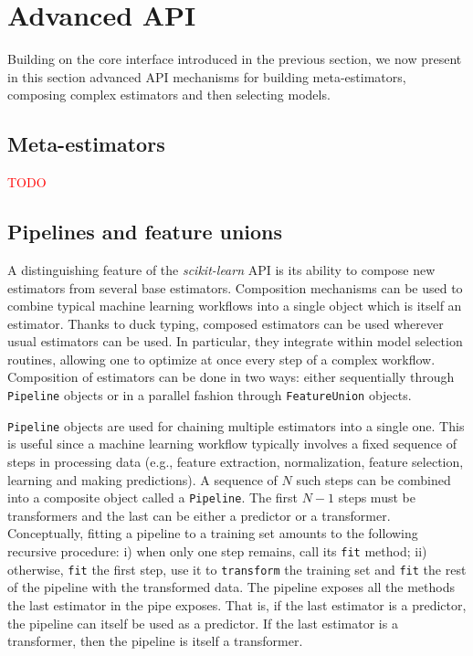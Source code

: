 \documentclass{llncs}
\newcommand{\sklearn}{\textit{scikit-learn}\xspace}
\begin{document}
\section{Advanced API}

\label{sec:advanced-api}

Building on the core interface introduced in the previous section, we now
present in this section advanced API mechanisms for building meta-estimators,
composing complex estimators and then selecting models.

\subsection{Meta-estimators}

\textcolor{red}{TODO}

\subsection{Pipelines and feature unions}

A distinguishing feature of the \sklearn API is its ability to
compose new estimators from several base estimators. Composition mechanisms can
be used to combine typical machine learning workflows into a single object which
is itself an estimator. Thanks to duck typing, composed
estimators can be used wherever usual estimators can be used. In particular,
they integrate within model selection routines, allowing one to optimize at once
every step of a complex workflow. Composition of estimators can be done in two
ways: either sequentially through \texttt{Pipeline} objects or in a parallel
fashion through \texttt{FeatureUnion} objects.

\texttt{Pipeline} objects are used for chaining multiple estimators into a
single one. This is useful since a machine learning workflow typically involves
a fixed sequence of steps in processing data (e.g., feature extraction,
normalization, feature selection, learning and making predictions). A sequence
of $N$ such steps can be combined into a composite object called a
\texttt{Pipeline}. The first $N-1$ steps must be transformers and the last can
be either a predictor or a transformer. Conceptually, fitting a pipeline to a
training set amounts to the following recursive procedure: i) when only one step
remains, call its \texttt{fit} method; ii) otherwise, \texttt{fit} the first
step, use it to \texttt{transform} the training set and \texttt{fit} the rest of
the pipeline with the transformed data. The pipeline exposes all the methods the
last estimator in the pipe exposes. That is, if the last estimator is a
predictor, the pipeline can itself be used as a predictor. If the last estimator
is a transformer, then the pipeline is itself a transformer.
\end{document}
